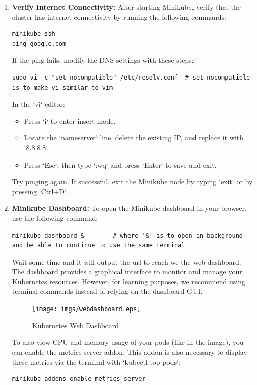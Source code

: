 \documentclass{article}
\begin{document}
\begin{enumerate}
      \item \textbf{Verify Internet Connectivity:}
      After starting Minikube, verify that the cluster has internet connectivity by running the following commands:
      \begin{lstlisting}
minikube ssh
ping google.com
      \end{lstlisting}
      If the ping fails, modify the DNS settings with these steps:
      \begin{lstlisting}
sudo vi -c "set nocompatible" /etc/resolv.conf  # set nocompatible is to make vi similar to vim
      \end{lstlisting}
      In the `vi` editor:
      \begin{itemize}
          \item Press `i` to enter insert mode.
          \item Locate the `nameserver` line, delete the existing IP, and replace it with `8.8.8.8`.
          \item Press `Esc`, then type `:wq` and press `Enter` to save and exit.
      \end{itemize}
      
      Try pinging again. If successful, exit the Minikube node by typing `exit` or by pressing `Ctrl+D`.

      \item \textbf{Minikube Dashboard:}
      To open the Minikube dashboard in your browser, use the following command:
      \begin{lstlisting}
minikube dashboard &        # where '&' is to open in background and be able to continue to use the same terminal
      \end{lstlisting}
      Wait some time and it will output the url to reach we the web dashboard. The dashboard provides a graphical interface to monitor and manage your Kubernetes resources. However, for learning purposes, we recommend using terminal commands instead of relying on the dashboard GUI.

      \begin{figure}[H]
        \centering
        \texttt{[image: imgs/webdashboard.eps]}
        \caption{Kubernetes Web Dashboard}
    \end{figure}

    To also view CPU and memory usage of your pods (like in the image), you can enable the metrics-server addon. This addon is also necessary to display these metrics via the terminal with `kubectl top pods`:
      \begin{lstlisting}
minikube addons enable metrics-server
      \end{lstlisting}

  \end{enumerate}
\end{document}
